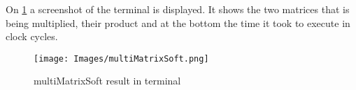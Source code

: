On \cref{fig:multiMatrixSoft} a screenshot of the terminal is displayed. It shows the two matrices that is being multiplied, their product and at the bottom the time it took to execute in clock cycles.  

\begin{figure}[H]
	\centering
	\texttt{[image: Images/multiMatrixSoft.png]}
	\caption{multiMatrixSoft result in terminal}
	\label{fig:multiMatrixSoft}
\end{figure}

 
 